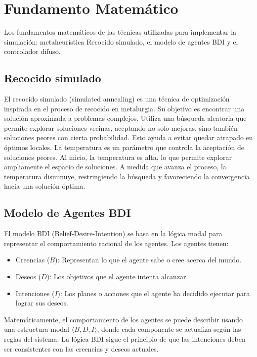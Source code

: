 \documentclass[10pt,twocolumn]{article}
\begin{document}
	\section{Fundamento Matemático}
	Los fundamentos matemáticos de las técnicas utilizadas para implementar la simulación: metaheur\'istica Recocido simulado, el modelo de agentes BDI y el controlador difuso.
	
	\subsection{Recocido simulado}
	
	El recocido simulado (simulated annealing) es una técnica de optimización inspirada en el proceso de recocido en metalurgia. Su objetivo es encontrar una solución aproximada a problemas complejos.
	Utiliza una búsqueda aleatoria que permite explorar soluciones vecinas, aceptando no solo mejoras, sino también soluciones peores con cierta probabilidad. Esto ayuda a evitar quedar atrapado en óptimos locales.
	La temperatura es un parámetro que controla la aceptación de soluciones peores. Al inicio, la temperatura es alta, lo que permite explorar ampliamente el espacio de soluciones. A medida que avanza el proceso, la temperatura disminuye, restringiendo la búsqueda y favoreciendo la convergencia hacia una solución óptima.
	
	
	\subsection{Modelo de Agentes BDI}
	El modelo BDI (Belief-Desire-Intention) se basa en la lógica modal para representar el comportamiento racional de los agentes. Los agentes tienen:
	\begin{itemize}
		\item Creencias (\(B\)): Representan lo que el agente sabe o cree acerca del mundo.
		\item Deseos (\(D\)): Los objetivos que el agente intenta alcanzar.
		\item Intenciones (\(I\)): Los planes o acciones que el agente ha decidido ejecutar para lograr sus deseos.
	\end{itemize}
	
	Matemáticamente, el comportamiento de los agentes se puede describir usando una estructura modal \( \langle B, D, I \rangle \), donde cada componente se actualiza según las reglas del sistema. La lógica BDI sigue el principio de que las intenciones deben ser consistentes con las creencias y deseos actuales.
	
\end{document}

